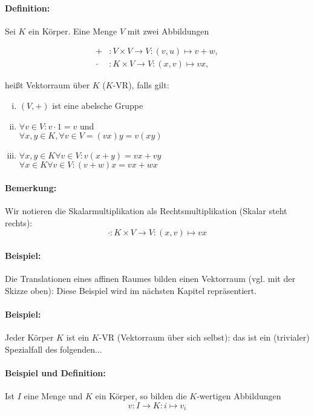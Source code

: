 \paragraph{Definition:}
	Sei $K$ ein Körper. Eine Menge $V$ mit zwei Abbildungen

	\begin{align*}
		 +&: V \times V \to V:(v,u)\mapsto v+w,\\
		 \cdot &: K \times V \to V:(x,v)\mapsto vx,
	\end{align*}
	
	heißt Vektorraum über $K$ ($K$-VR), falls gilt:
	\begin{enumerate}[(i)]
		\item $(V,+)$ ist eine abelsche Gruppe
		\item $\forall v\in V: v\cdot 1=v$ und\\
			$\forall x,y \in K, \forall v\in V= (vx)y = v(xy)$
		\item $\forall x,y \in K \forall v\in V: v(x+y) = vx + vy$\\
			$\forall x\in K \forall v\in V: (v+w)x = vx + wx$
	\end{enumerate}

\paragraph{Bemerkung:}
	Wir notieren die Skalarmultiplikation als Rechtsmultiplikation (Skalar steht rechts):
	\begin{equation*}
		\cdot: K \times V \to V : (x,v) \mapsto vx
	\end{equation*}

\paragraph{Beispiel:}
	Die Translationen eines affinen Raumes bilden einen Vektorraum (vgl. mit der Skizze oben): Diese Beispiel wird im nächsten Kapitel repräsentiert.
	
\paragraph{Beispiel:}
	Jeder Körper $ K $ ist ein $ K $-VR (Vektorraum über sich selbst): das ist ein (trivialer) Spezialfall des folgenden...
	
\paragraph{Beispiel und Definition:}
	Ist $ I $ eine Menge und $ K $ ein Körper, so bilden die $ K $-wertigen Abbildungen
	\begin{equation*}
		v: I \to K: i \mapsto v_i
	\end{equation*}

